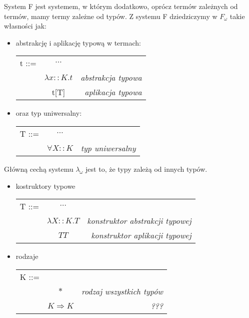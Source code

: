 \documentclass[11pt,leqno]{article}
\begin{document}
System F jest systemem, w którym dodatkowo, oprócz termów zależnych od termów, mamy termy zależne od typów. Z systemu F dziedziczymy w $F_{\omega}$ takie własności jak: 
\begin{itemize}
    \item abstrakcję i aplikację typową w termach: \\
\begin{tabular}{| l c r |}
  \hline
  t ::= & $\cdots$ &  \\
   & $\lambda x::K.t$ & \textit{abstrakcja typowa} \\
   & t[T] & \textit{aplikacja typowa} \\
  \hline
\end{tabular}

    \item  oraz typ uniwersalny: \\
\begin{tabular}{| l c r |}
  \hline
  T ::= & $\cdots$ &  \\
   & $\forall X::K$ & \textit{typ uniwersalny} \\
  \hline
\end{tabular}

\end{itemize}

Główną cechą systemu $\lambda_{\omega}$ jest to, że typy zależą od innych typów. 
\begin{itemize}
    \item kostruktory typowe \\
\begin{tabular}{| l c r |}
   \hline
   T ::= & $\cdots$ &  \\
   & $\lambda X::K.T$ & \textit{konstruktor abstrakcji typowej} \\
   & $T T$ & \textit{konstruktor aplikacji typowej} \\
   \hline
\end{tabular}
    \item rodzaje \\
\begin{tabular}{| l c r |}
  \hline
  K ::= &  &   \\
   & $\ast$ & \textit{rodzaj wszystkich typów} \\
   & $K \Rightarrow K$ & \textit{???} \\
  \hline
\end{tabular}
\end{itemize} 
\end{document}
